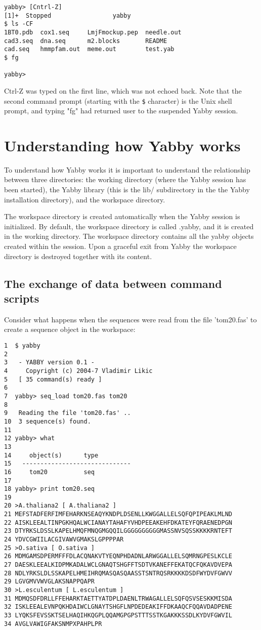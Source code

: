 \begin{verbatim}
yabby> [Cntrl-Z]
[1]+  Stopped                 yabby
$ ls -CF
1BT0.pdb  cox1.seq     LmjFmockup.pep  needle.out
cad3.seq  dna.seq      m2.blocks       README
cad.seq   hmmpfam.out  meme.out        test.yab
$ fg

yabby>
\end{verbatim}

Ctrl-Z was typed on the first line, which was not echoed back. Note
that the second command prompt (starting with the {\tt \$} character)
is the Unix shell prompt, and typing "fg" had returned user to
the suspended Yabby session.

\section{Understanding how Yabby works}

To understand how Yabby works it is important to understand the
relationship between three directories: the working directory
(where the Yabby session has been started), the Yabby library (this
is the lib/ subdirectory in the the Yabby installation directory),
and the workspace directory.

The workspace directory is created automatically when the Yabby
session is initialized. By default, the workspace directory is
called .yabby, and it is created in the working directory. The
workspace directory contains all the yabby objects created within
the session. Upon a graceful exit from Yabby the workspace directory
is destroyed together with its content.

\subsection{The exchange of data between command scripts}

Consider what happens when the sequences were read from the file
'tom20.fas' to create a sequence object in the workspace:

\begin{verbatim}
1  $ yabby
2 
3   - YABBY version 0.1 -
4     Copyright (c) 2004-7 Vladimir Likic
5   [ 35 command(s) ready ]
6 
7  yabby> seq_load tom20.fas tom20
8  
9   Reading the file 'tom20.fas' ..
10  3 sequence(s) found.
11 
12 yabby> what
13 
14     object(s)      type
15   ------------------------------
16     tom20          seq   
17 
18 yabby> print tom20.seq
19
20 >A.thaliana2 [ A.thaliana2 ]
21 MEFSTADFERFIMFEHARKNSEAQYKNDPLDSENLLKWGGALLELSQFQPIPEAKLMLND
22 AISKLEEALTINPGKHQALWCIANAYTAHAFYVHDPEEAKEHFDKATEYFQRAENEDPGN
23 DTYRKSLDSSLKAPELHMQFMNQGMGQQILGGGGGGGGGGMASSNVSQSSKKKKRNTEFT
24 YDVCGWIILACGIVAWVGMAKSLGPPPPAR
25 >O.sativa [ O.sativa ]
26 MDMGAMSDPERMFFFDLACQNAKVTYEQNPHDADNLARWGGALLELSQMRNGPESLKCLE
27 DAESKLEEALKIDPMKADALWCLGNAQTSHGFFTSDTVKANEFFEKATQCFQKAVDVEPA
28 NDLYRKSLDLSSKAPELHMEIHRQMASQASQAASSTSNTRQSRKKKKDSDFWYDVFGWVV
29 LGVGMVVWVGLAKSNAPPQAPR
30 >L.esculentum [ L.esculentum ]
31 MDMQSDFDRLLFFEHARKTAETTYATDPLDAENLTRWAGALLELSQFQSVSESKKMISDA
32 ISKLEEALEVNPQKHDAIWCLGNAYTSHGFLNPDEDEAKIFFDKAAQCFQQAVDADPENE
33 LYQKSFEVSSKTSELHAQIHKQGPLQQAMGPGPSTTTSSTKGAKKKSSDLKYDVFGWVIL
34 AVGLVAWIGFAKSNMPXPAHPLPR
\end{verbatim}


